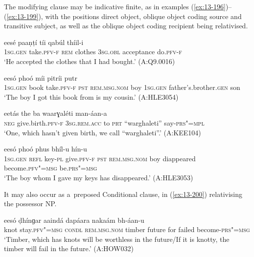 The modifying clause may be indicative finite, as in examples (\ref{ex:13-196})--(\ref{ex:13-199}), with the positions direct object, oblique object coding source and transitive subject, as well as the oblique object coding recipient being relativised.

\begin{exe}
\ex
\label{ex:13-196}
 eesé paaṇṭí tíi qabúl  thíil-i \\
\textsc{1sg.gen} take.\textsc{pfv-f} \textsc{rem} clothes \textsc{3sg.obl} acceptance do.\textsc{pfv-f} \\
\glt `He accepted the clothes that I had bought.' (A:Q9.0016)

\ex
\label{ex:13-197}
 eesó phoó  míi pitríi putr \\
\textsc{1sg.gen} book take.\textsc{pfv-f} \textsc{pst} \textsc{rem.msg.nom} boy  \textsc{1sg.gen} father's.brother.\textsc{gen} son \\
\glt `The boy I got this book from is my cousin.' (A:HLE3054)

\ex
\label{ex:13-198}
\gll [na ǰéel-i] eetás the ba  waarɣaléti man-áan-a \\
\textsc{neg} give.birth.\textsc{pfv-f} \textsc{3sg.rem.acc} to \textsc{prt}  ``warghaleti'' say-\textsc{prs"=mpl} \\
\glt `One, which hasn't given birth, we call ``warghaleti''.' (A:KEE104)

\ex
\label{ex:13-199}
 eesó  phoó phus bhíl-u hín-u  \\
\textsc{1sg.gen} \textsc{refl} key-\textsc{pl} give.\textsc{pfv-f} \textsc{pst} \textsc{rem.msg.nom}  boy diappeared become.\textsc{pfv"=msg} be.\textsc{prs"=msg} \\
\glt `The boy whom I gave my keys has disappeared.' (A:HLE3053) 
\end{exe}

It may also occur as a~preposed Conditional clause, in (\ref{ex:13-200}) relativising the possessor NP.

\begin{exe}
\ex
\label{ex:13-200}
 eesó ḍhínɡar aaindá  dapáara nakaám bh-áan-u  \\
knot stay.\textsc{pfv"=msg} \textsc{condl} \textsc{rem.msg.nom} timber future  for failed become-\textsc{prs"=msg} \\
\glt `Timber, which has knots will be worthless in the future/If it is knotty, the timber will fail in the future.' (A:HOW032) 
\end{exe}

